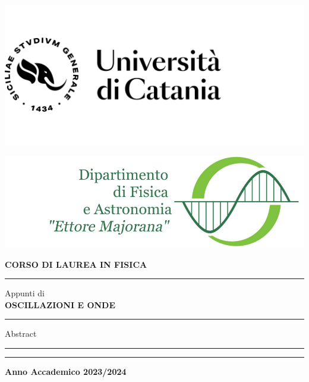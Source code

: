 \begin{titlepage}
    \begin{center}
        \begin{minipage}[ht!]{0.49\textwidth}
                \includegraphics[width=\textwidth]{images/LogoUniCT.png}
        \end{minipage}
        \hfill
        \begin{minipage}[th!]{0.49\textwidth}
                \includegraphics[width=\textwidth]{images/LogoDFA.png}
        \end{minipage}
        \large
        \textbf{CORSO DI LAUREA IN FISICA}
        \vspace{0.5cm}
        \hrule
        \vspace{3cm}
        
        \centering

        Appunti di\\\Huge{\textbf{OSCILLAZIONI E ONDE}}\\
        
        \vfill
        
        \begin{minipage}[h]{0.35\textwidth}
            \hrule
            \vspace{0.3cm}
            \small \centering
            Abstract
            \vspace{0.35cm}
            \hrule
        \end{minipage}
        
        \vfill
        
        \hrule
        \vspace{0.3cm}
        \normalsize
        \textbf{Anno Accademico 2023/2024}
    \end{center}
\end{titlepage}